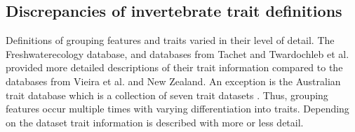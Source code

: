 \documentclass[../Draft_harmonization_paper.tex]{subfiles}
\begin{document}

\subsection*{Discrepancies of invertebrate trait definitions}

Definitions of grouping features and traits varied in their level of detail. The Freshwaterecology database, and databases from Tachet and Twardochleb et al. provided more detailed descriptions of their trait information compared to the databases from Vieira et al. and New Zealand. An exception is the Australian trait database which is a collection of seven trait datasets \cite{kefford_integrated_2020}. Thus, grouping features occur multiple times with varying differentiation into traits. Depending on the dataset trait information is described with more or less detail.
\end{document}
